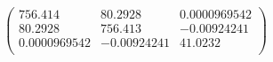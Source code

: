 \documentclass{article}
\begin{document}
\[\left(
\begin{array}{ccc}
 756.414 & 80.2928 & 0.0000969542 \\
 80.2928 & 756.413 & -0.00924241 \\
 0.0000969542 & -0.00924241 & 41.0232 \\
\end{array}
\right)\]
\end{document}
